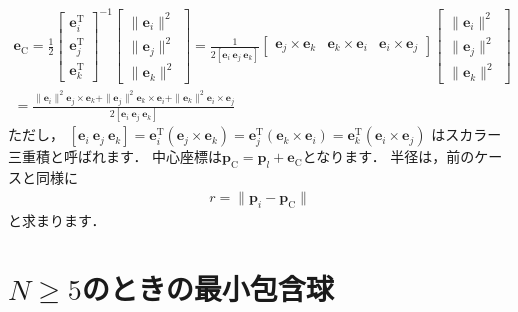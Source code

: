 ﻿\documentclass[a4paper]{jsarticle}
\begin{document}
\begin{align*}
\boldsymbol{e}_{\mathrm{C}}=
\frac{1}{2}
\begin{bmatrix} \boldsymbol{e}_{i}^{\mathrm{T}} \\ \boldsymbol{e}_{j}^{\mathrm{T}} \\ \boldsymbol{e}_{k}^{\mathrm{T}} \end{bmatrix}^{-1}
\begin{bmatrix} \|\boldsymbol{e}_{i}\|^{2} \\ \|\boldsymbol{e}_{j}\|^{2} \\ \|\boldsymbol{e}_{k}\|^{2} \end{bmatrix}
=
\frac{1}{2\left[\boldsymbol{e}_{i}~\boldsymbol{e}_{j}~\boldsymbol{e}_{k}\right]}
\begin{bmatrix}
\boldsymbol{e}_{j}\times\boldsymbol{e}_{k} & \boldsymbol{e}_{k}\times\boldsymbol{e}_{i} & \boldsymbol{e}_{i}\times\boldsymbol{e}_{j}
\end{bmatrix}
\begin{bmatrix} \|\boldsymbol{e}_{i}\|^{2} \\ \|\boldsymbol{e}_{j}\|^{2} \\ \|\boldsymbol{e}_{k}\|^{2} \end{bmatrix}
\\
=
\frac{
\|\boldsymbol{e}_{i}\|^{2}\boldsymbol{e}_{j}\times\boldsymbol{e}_{k}
+\|\boldsymbol{e}_{j}\|^{2}\boldsymbol{e}_{k}\times\boldsymbol{e}_{i}
+\|\boldsymbol{e}_{k}\|^{2}\boldsymbol{e}_{i}\times\boldsymbol{e}_{j}
}
{2\left[\boldsymbol{e}_{i}~\boldsymbol{e}_{j}~\boldsymbol{e}_{k}\right]}
\end{align*}
ただし，
$\left[\boldsymbol{e}_{i}~\boldsymbol{e}_{j}~\boldsymbol{e}_{k}\right]
=\boldsymbol{e}_{i}^{\mathrm{T}}(\boldsymbol{e}_{j}\times\boldsymbol{e}_{k})
=\boldsymbol{e}_{j}^{\mathrm{T}}(\boldsymbol{e}_{k}\times\boldsymbol{e}_{i})
=\boldsymbol{e}_{k}^{\mathrm{T}}(\boldsymbol{e}_{i}\times\boldsymbol{e}_{j})$
はスカラー三重積と呼ばれます．
中心座標は$\boldsymbol{p}_{\mathrm{C}}=\boldsymbol{p}_{l}+\boldsymbol{e}_{\mathrm{C}}$となります．
半径は，前のケースと同様に
\begin{align*}
r=\|\boldsymbol{p}_{i}-\boldsymbol{p}_{\mathrm{C}}\|
\end{align*}
と求まります．

\section{$N\geq 5$のときの最小包含球}
\end{document}
